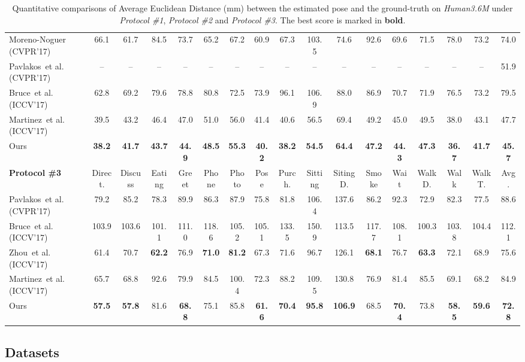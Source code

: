 \documentclass[letterpaper]{article} \usepackage{aaai18}  \usepackage{times}  \usepackage{helvet}  \usepackage{courier}  \usepackage{url}  \usepackage{color}
\begin{document}
\begin{table*}[ptb]
{\begin{tabular}{@{}lcccccccccccccccc@{}}
Moreno-Noguer (CVPR'17) & 66.1 & 61.7 & 84.5 & 73.7 & 65.2 & 67.2 & 60.9 & 67.3 & 103.5 & 74.6 & 92.6 & 69.6 & 71.5 & 78.0 & 73.2 & 74.0\\
Pavlakos~et al. (CVPR'17)  & -- & -- & -- & -- & -- & -- & -- & -- & -- & -- & -- & -- & -- & -- & -- & 51.9\\
Bruce~et al. (ICCV'17) & 62.8 & 69.2 & 79.6 & 78.8 & 80.8 & 72.5 & 73.9 & 96.1 & 106.9 & 88.0 & 86.9 & 70.7 & 71.9 & 76.5 & 73.2 & 79.5\\
Martinez~et al. (ICCV'17) & 39.5 & 43.2&46.4&	47.0&	51.0&	56.0&	41.4&	40.6&	56.5&	69.4&	49.2&	45.0&	49.5&	38.0&	43.1&	47.7\\
\midrule
Ours & \bf{38.2} & \bf{41.7}&	\bf{43.7}&	\bf{44.9}&	\bf{48.5}&	\bf{55.3}&	\bf{40.2}&	\bf{38.2}&	\bf{54.5}&	\bf{64.4}&	\bf{47.2}&	\bf{44.3}&	\bf{47.3}&	\bf{36.7}&	\bf{41.7}&	\bf{45.7}\\
\toprule
\textbf{Protocol \#3} & Direct. & Discuss & Eating & Greet & Phone & Photo & Pose & Purch. & Sitting & SitingD. & Smoke & Wait & WalkD. & Walk & WalkT. & Avg.\\
\midrule
Pavlakos~et al. (CVPR'17) & 79.2 & 85.2 & 78.3 & 89.9 & 86.3 & 87.9 & 75.8 & 81.8 & 106.4 & 137.6 & 86.2 & 92.3 & 72.9 & 82.3 & 77.5 & 88.6\\
Bruce~et al. (ICCV'17) & 103.9 & 103.6 & 101.1 & 111.0 & 118.6 & 105.2 & 105.1 & 133.5 & 150.9 & 113.5 & 117.7 & 108.1 & 100.3 & 103.8 & 104.4 & 112.1\\
Zhou~et al. (ICCV'17) & 61.4 & 70.7 & \bf{62.2} & 76.9 & \bf{71.0} & \bf{81.2} & 67.3 & 71.6 & 96.7 & 126.1 & \bf{68.1} & 76.7 & \bf{63.3} & 72.1 & 68.9 & 75.6\\
Martinez~et al. (ICCV'17) & 65.7 & 68.8 & 92.6 & 79.9 & 84.5 & 100.4 & 72.3 & 88.2 & 109.5 & 130.8 & 76.9 & 81.4 & 85.5 & 69.1 & 68.2 & 84.9\\
\midrule
Ours & \bf{57.5}&  \bf{57.8}& 81.6&	\bf{68.8}&	75.1&	85.8&	\bf{61.6}&	\bf{70.4}&	\bf{95.8}&	\bf{106.9}&	68.5&	\bf{70.4}&	73.8&	\bf{58.5}&	\bf{59.6}&	\bf{72.8}\\
\bottomrule
\end{tabular}
}
\caption{Quantitative comparisons of Average Euclidean Distance (mm) between the estimated pose and the ground-truth on \textit{Human3.6M} under \textit{Protocol \#1}, \textit{Protocol \#2} and \textit{Protocol \#3}. The best score is marked in \textbf{bold}.}
\label{tab:h36m}
\end{table*}

\subsection{Datasets}
\end{document}
